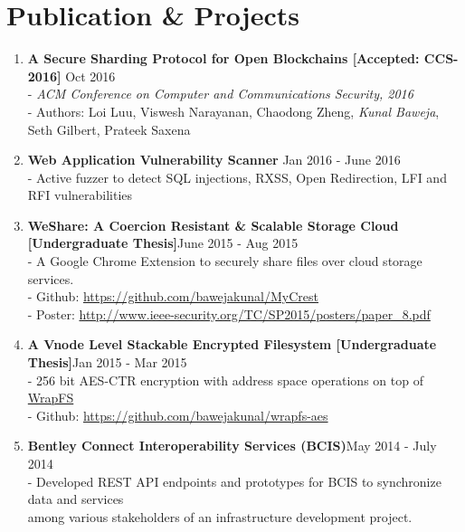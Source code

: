 \documentclass{article}
\begin{document}
\section*{Publication \& Projects}
\begin{enumerate}

    \item \textbf{A Secure Sharding Protocol for Open Blockchains [Accepted: CCS-2016]} {\hfill Oct 2016}\\
    - \textit{ACM Conference on Computer and Communications Security, 2016}\\
    - Authors: Loi Luu, Viswesh Narayanan, Chaodong Zheng, \textit{Kunal Baweja}, Seth Gilbert, Prateek Saxena

    \item \textbf{Web Application Vulnerability Scanner} {\hfill Jan 2016 - June 2016}\\
    - Active fuzzer to detect SQL injections, RXSS, Open Redirection, LFI and RFI vulnerabilities 

    \item \textbf{WeShare: A Coercion Resistant \& Scalable Storage Cloud [Undergraduate Thesis]}{\hfill June 2015 - Aug 2015}\\
    - A Google Chrome Extension to securely share files over cloud storage services.\\
    - Github: \href{https://github.com/bawejakunal/MyCrest}{https://github.com/bawejakunal/MyCrest}\\
    - Poster: \href{http://www.ieee-security.org/TC/SP2015/posters/paper\_8.pdf}{http://www.ieee-security.org/TC/SP2015/posters/paper\_8.pdf}

    \item \textbf{A Vnode Level Stackable Encrypted Filesystem [Undergraduate Thesis]}{\hfill Jan 2015 - Mar 2015}\\
    - 256 bit AES-CTR encryption with address space operations on top of \href{http://wrapfs.filesystems.org/}{WrapFS}\\
    - Github: \href{https://github.com/bawejakunal/wrapfs-aes}{https://github.com/bawejakunal/wrapfs-aes}
    
    \item \textbf{Bentley Connect Interoperability Services (BCIS)}{\hfill May 2014 - July 2014}\\
    - Developed REST API endpoints and prototypes for BCIS to synchronize data and services\\
    \hspace*{0.7em}among various stakeholders of an infrastructure development project.
    

\end{enumerate}
\end{document}
